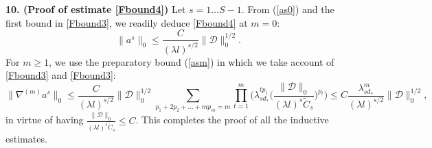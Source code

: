 \documentclass[reqno,twoside,11pt]{amsart}
\numberwithin{equation}{section}
\theoremstyle{plain}
\theoremstyle{definition}
\begin{document}
\medskip

{\bf 10. (Proof of estimate \ref{Fbound4})} Let $s=1\ldots S-1$. From
(\ref{as0}) and the first bound in \ref{Fbound3}, we readily deduce
\ref{Fbound4} at $m=0$:
$$\|a^s\|_0\leq \frac{C}{(\lambda l)^{s/2}}\|\mathcal{D}\|_0^{1/2}.$$
For $m\geq 1$, we use the preparatory bound (\ref{asm}) in which we
take account of \ref{Fbound3} and \ref{Fbound3}:
\begin{equation*}
\|\nabla^{(m)}a^s\|_0\leq \frac{C}{(\lambda
  l)^{s/2}}\|\mathcal{D}\|_0^{1/2} \sum_{p_1+2p_2+\ldots +mp_m=m}
\prod_{t=1}^m \Big(\lambda_{sd_*}^{tp_t}\Big(\frac{\|\mathcal{D}\|_0}{(\lambda l)^s
  \tilde C_s}\Big)^{p_t}\Big)\leq C\frac{\lambda_{sd_*}^m}{(\lambda l)^{s/2}}\|\mathcal{D}\|_0^{1/2}, 
\end{equation*}
in virtue of having $\frac{\|\mathcal{D}\|_0}{(\lambda l)^s \tilde
  C_s}\leq C$. This completes the proof of all the inductive estimates.

\medskip
\end{document}
